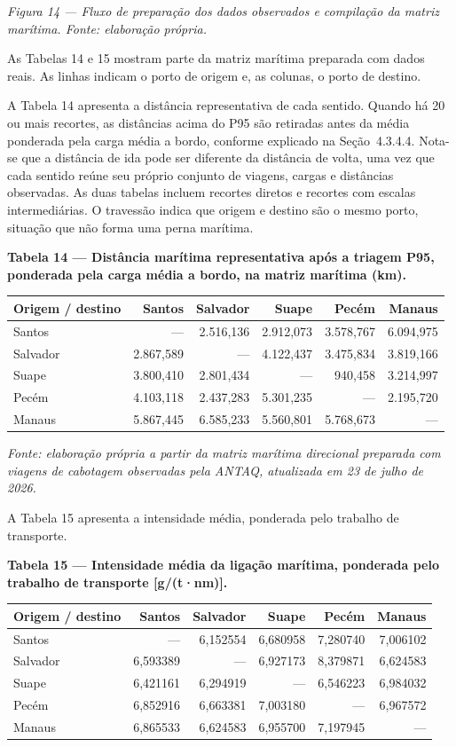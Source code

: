 \documentclass[brazil,]{article}
\newcommand{\keeptable}{\Needspace{0.64\textheight}}
\begin{document}
\emph{Figura 14 --- Fluxo de preparação dos dados observados e compilação
da matriz marítima. Fonte: elaboração própria.}

As Tabelas 14 e 15 mostram parte da matriz marítima preparada com dados
reais. As linhas indicam o porto de origem e, as colunas, o porto de
destino.

A Tabela 14 apresenta a distância representativa de cada sentido. Quando
há 20 ou mais recortes, as distâncias acima do P95 são retiradas antes da
média ponderada pela carga média a bordo, conforme explicado na
Seção~4.3.4.4. Nota-se que a distância de ida pode ser diferente da
distância de volta, uma vez que cada sentido reúne seu próprio conjunto
de viagens, cargas e distâncias observadas. As duas tabelas incluem
recortes diretos e recortes com escalas intermediárias. O travessão
indica que origem e destino são o mesmo porto, situação que não forma
uma perna marítima.

\keeptable
\textbf{Tabela 14 --- Distância marítima representativa após a triagem
P95, ponderada pela carga média a bordo, na matriz marítima (km).}

\begin{longtable}[]{@{}lrrrrr@{}}
\toprule
Origem / destino & Santos & Salvador & Suape & Pecém &
Manaus\tabularnewline
\midrule
\endhead
Santos & --- & 2.516,136 & 2.912,073 & 3.578,767 &
6.094,975\tabularnewline
Salvador & 2.867,589 & --- & 4.122,437 & 3.475,834 &
3.819,166\tabularnewline
Suape & 3.800,410 & 2.801,434 & --- & 940,458 &
3.214,997\tabularnewline
Pecém & 4.103,118 & 2.437,283 & 5.301,235 & --- &
2.195,720\tabularnewline
Manaus & 5.867,445 & 6.585,233 & 5.560,801 & 5.768,673 &
---\tabularnewline
\bottomrule
\end{longtable}

\emph{Fonte: elaboração própria a partir da matriz marítima direcional
preparada com viagens de cabotagem observadas pela ANTAQ, atualizada em
23 de julho de 2026.}

A Tabela 15 apresenta a intensidade média, ponderada pelo trabalho de
transporte.

\keeptable
\textbf{Tabela 15 --- Intensidade média da ligação marítima, ponderada
pelo trabalho de transporte {[}g/(t·nm){]}.}

\begin{longtable}[]{@{}lrrrrr@{}}
\toprule
Origem / destino & Santos & Salvador & Suape & Pecém &
Manaus\tabularnewline
\midrule
\endhead
Santos & --- & 6,152554 & 6,680958 & 7,280740 & 7,006102\tabularnewline
Salvador & 6,593389 & --- & 6,927173 & 8,379871 &
6,624583\tabularnewline
Suape & 6,421161 & 6,294919 & --- & 6,546223 & 6,984032\tabularnewline
Pecém & 6,852916 & 6,663381 & 7,003180 & --- & 6,967572\tabularnewline
Manaus & 6,865533 & 6,624583 & 6,955700 & 7,197945 & ---\tabularnewline
\bottomrule
\end{longtable}
\end{document}
